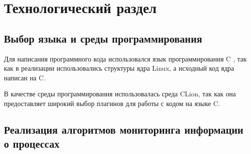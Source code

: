 \chapter{Технологический раздел}

\section{Выбор языка и среды программирования}
Для написания программного кода использовался язык программирования C \cite{bib:4}, так как в реализации использовались структуры ядра Linux, а исходный код ядра написан на C.

В качестве среды программирования использовалась среда CLion, так как она предоставляет широкий выбор плагинов для работы с кодом на языке C.

\section{Реализация алгоритмов мониторинга информации о процессах}

